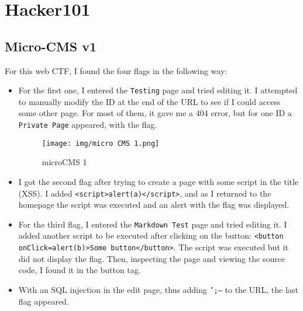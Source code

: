 \documentclass{article}
\begin{document}
\section{Hacker101}
\subsection{Micro-CMS v1}
For this web CTF, I found the four flags in the following way:
\begin{itemize}
    \item {For the first one, I entered the \texttt{Testing} page and tried editing it.
    I attempted to manually modify the ID at the end of the URL to see if I could access some other page.
    For most of them, it gave me a 404 error, but for one ID a \texttt{Private Page} appeared, with the flag.
    \begin{figure}[H]
        \centering
        \texttt{[image: img/micro CMS 1.png]}
        \caption{microCMS 1}
        \label{fig:microCMS 1}
    \end{figure}
    }
    
    \item {I got the second flag after trying to create a page with some script in the title (XSS).
    I added \texttt{<script>alert(a)</script>}, and as I returned to the homepage the script was executed and an alert with the flag was displayed.}
    
    \item {For the third flag, I entered the \texttt{Markdown Test} page and tried editing it.
    I added another script to be executed after clicking on the button: \texttt{<button onClick=alert(b)>Some button</button>}.
    The script was executed but it did not display the flag. Then, inspecting the page and viewing the source code, I found it in the button tag.}
    
    \item {With an SQL injection in the edit page, thus adding \texttt{';--} to the URL, the last flag appeared.}
\end{itemize}

\end{document}
